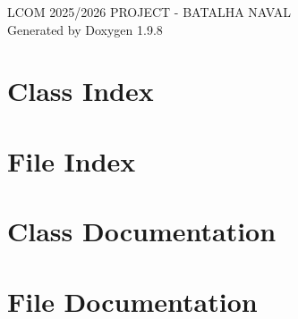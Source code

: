 \documentclass[twoside]{book}
\newcommand{\+}{\discretionary{\mbox{\scriptsize$\hookleftarrow$}}{}{}}
\newcommand{\clearemptydoublepage}{%
    \newpage{\pagestyle{empty}\cleardoublepage}%
  }
\begin{document}
  \raggedbottom
    \hypersetup{pageanchor=false,
                bookmarksnumbered=true,
                pdfencoding=unicode
               }
  \begin{titlepage}
  \vspace*{7cm}
  \begin{center}%
  {\Large LCOM 2025/2026 PROJECT -\/ BATALHA NAVAL}\\
  \vspace*{1cm}
  {\large Generated by Doxygen 1.9.8}\\
  \end{center}
  \end{titlepage}
  \clearemptydoublepage
  \tableofcontents
  \clearemptydoublepage
  \hypersetup{pageanchor=true}

\chapter{Class Index}

\chapter{File Index}

\chapter{Class Documentation}












\chapter{File Documentation}




























  \backmatter
  \newpage
  \clearemptydoublepage
  \printindex
\end{document}
